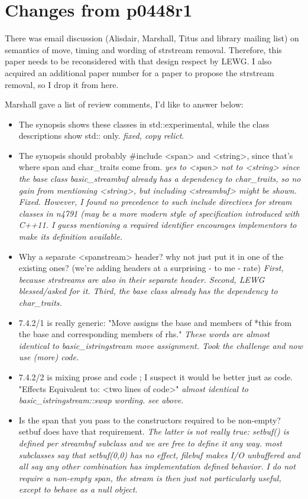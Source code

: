 \documentclass[ebook,11pt,article]{memoir}
\begin{document}
\section{Changes from p0448r1}
There was email discussion (Alisdair, Marshall, Titus and library mailing list) on semantics of move, timing and wording of strstream removal. Therefore, this paper needs to be reconsidered with that design respect by LEWG. I also acquired an additional paper number for a paper to propose the strstream removal, so I drop it from here.

Marshall gave a list of review comments, I'd like to answer below:
\begin{itemize}

\item  
The synopsis shows these classes in std::experimental, while the class descriptions show std:: only.
\textit{fixed, copy relict}.
\item  
The synopsis should probably \#include <span> and <string>, since that's where span and char_traits come from.
\textit{yes to <span> not to <string> since the base class basic_streambuf already has a dependency to char_traits, so no gain from mentioning <string>, but including <streambuf> might be shown. Fixed. However, I found no precedence to such include directives for stream classes in n4791 (may be a more modern style of specification introduced with C++11. I guess mentioning a required identifier encourages implementors to make its definition available. }
\item 
Why a separate <spanstream> header? why not just put it in one of the existing ones? 
       (we're adding headers at a surprising - to me - rate)
\textit{First, because strstreams are also in their separate header. Second, LEWG blessed/asked for it.
Third, the base class already has the dependency to char_traits.}
\item  7.4.2/1 is really generic: "Move assigns the base and members of *this from the base and corresponding members of rhs."
\textit{These words are almost identical to basic_istringstream move assignment. Took the challenge and now use (more) code.}
\item  7.4.2/2 is mixing prose and code ; I suspect it would be better just as code. "Effects Equivalent to: <two lines of code>"
\textit{almost identical to basic_istringstream::swap wording. see above.}
\item  Is the span that you pass to the constructors required to be non-empty?  setbuf does have that requirement.
\textit{The latter is not really true: setbuf() is defined per streambuf subclass and we are free to define it any way. most subclasses say that setbuf(0,0) has no effect, filebuf makes I/O unbuffered and all say any other combination has implementation defined behavior. I do not require a non-empty span, the stream is then just not particularly useful, except to behave as a null object.}
\end{itemize}
\end{document}
